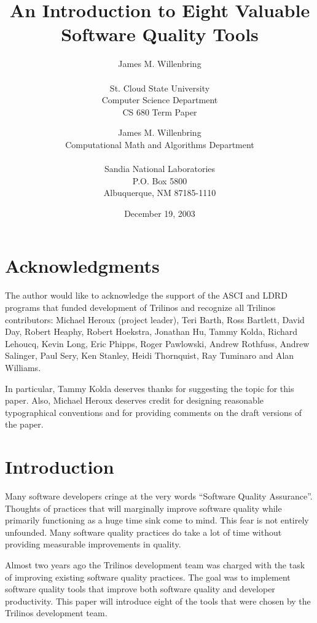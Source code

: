 \documentclass[12pt,relax]{article}
\title{An Introduction to Eight Valuable Software Quality Tools}
\author{
James M. Willenbring \\
 \\
St. Cloud State University\\
Computer Science Department\\
CS 680 Term Paper
}
\date{December 19, 2003} %
\author{
James M. Willenbring \\
Computational Math and Algorithms Department \\
 \\
Sandia National Laboratories \\
P.O. Box 5800 \\
Albuquerque, NM 87185-1110}
\begin{document}
\maketitle



\clearpage

\section*{Acknowledgments}

The author would like to acknowledge the support of the ASCI and LDRD 
programs that funded development of Trilinos and recognize all Trilinos 
contributors: Michael Heroux (project leader), Teri Barth, Ross Bartlett, 
David Day, Robert Heaphy, Robert Hoekstra, 
Jonathan Hu, Tammy Kolda, Richard Lehoucq, Kevin Long, Eric Phipps, 
Roger Pawlowski, Andrew Rothfuss, Andrew Salinger, Paul Sery, Ken
Stanley, Heidi Thornquist, Ray Tuminaro and Alan Williams.

In particular, Tammy Kolda deserves thanks for suggesting the topic for
this paper.  Also, Michael Heroux deserves credit for designing 
reasonable typographical conventions and for providing comments on the draft
versions of the paper.

\clearpage
\tableofcontents
\listoffigures
\listoftables

\clearpage
%

\section{Introduction}
\label{Section:Introduction}

Many software developers cringe at the very words ``Software Quality 
Assurance''.  Thoughts of practices that will marginally improve software 
quality while primarily functioning as a huge time sink come to mind.  This 
fear is not entirely unfounded.  Many software quality practices do take a lot 
of time without providing measurable improvements in quality.

Almost two years ago the Trilinos development team was charged with the task 
of improving existing software quality practices.  The goal was to implement 
software quality tools that improve both software quality and developer 
productivity.  This paper will introduce eight of the tools that were 
chosen by the Trilinos development team.
\end{document}
